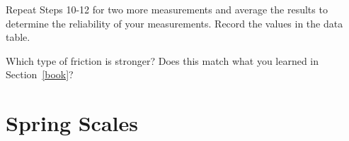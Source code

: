 \documentclass[10pt]{exam}
\begin{document}
\begin{questions}
\begin{minipage}[b]{11cm}
        \vspace{1cm}

      \end{minipage}
      


  \question
    Repeat Steps 10-12 for two more measurements and average the results to determine the reliability of your measurements. Record the values in the data table. 


  \question
    Which type of friction is stronger?  Does this match what you learned in Section~\ref{book}?
    \vs
  
\end{questions}

\pagebreak
\section{Spring Scales} \label{scales}
\end{document}
